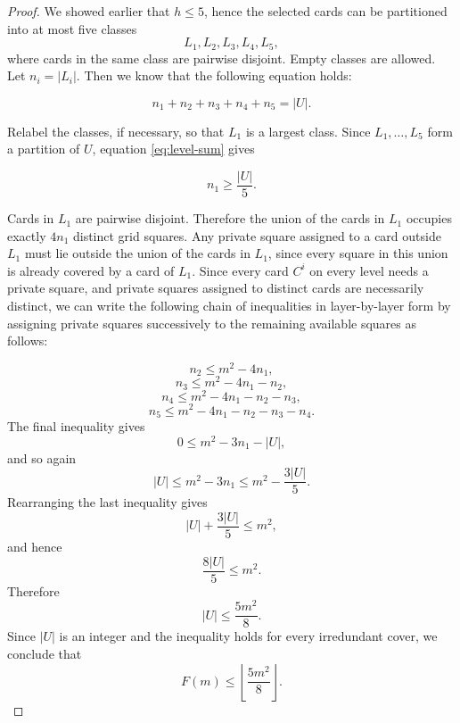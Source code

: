 \documentclass[11pt]{article}
\begin{document}
	\begin{proof}
		We showed earlier that \(h\le5\), hence the selected cards can be partitioned into at most five classes
		\[
		L_1,L_2,L_3,L_4,L_5,
		\]
		where cards in the same class are pairwise disjoint. Empty classes are allowed. Let $n_i=|L_i|.$ Then we know that the following equation holds:
		
		\begin{equation}
			n_1+n_2+n_3+n_4+n_5=|U|.
			\label{eq:level-sum}
		\end{equation}
		
		Relabel the classes, if necessary, so that \(L_1\) is a largest class. Since \(L_1,\ldots,L_5\) form a partition of \(U\), equation \eqref{eq:level-sum} gives
		
		$$
		n_1\ge \frac{|U|}{5}.
		$$
		
		Cards in \(L_1\) are pairwise disjoint. Therefore the union of the cards in
		\(L_1\) occupies exactly \(4n_1\) distinct grid squares. Any private square assigned to a card outside \(L_1\) must lie outside the union of the cards in \(L_1\), since every square in this union is already covered by a card of \(L_1\).
		Since every card \(C^i\) on every level needs a private square, and private squares assigned to distinct cards are necessarily distinct, we can write the following chain of inequalities in layer-by-layer form by assigning private squares successively to the remaining available squares as follows:
		
		
		\[
		n_2\le m^2-4n_1,
		\]
		\[
		n_3\le m^2-4n_1-n_2,
		\]
		\[
		n_4\le m^2-4n_1-n_2-n_3,
		\]
		\[
		n_5\le m^2-4n_1-n_2-n_3-n_4.
		\]
		The final inequality gives
		\[
		0\le %
		m^2-3n_1-|U|,
		\]
		and so again
		\[
		|U|\le m^2-3n_1\le m^2-\frac{3|U|}{5}.
		\]
		Rearranging the last inequality gives
		\[
		|U|+\frac{3|U|}{5}\le m^2,
		\]
		and hence
		\[
		\frac{8|U|}{5}\le m^2.
		\]
		Therefore
		\[
		|U|\le \frac{5m^2}{8}.
		\]
		Since \(|U|\) is an integer and the inequality holds for every irredundant cover,
		we conclude that
		\[
		F(m)\le \left\lfloor\frac{5m^2}{8}\right\rfloor.
		\]
		
	\end{proof}
	
	
	
\end{document}
